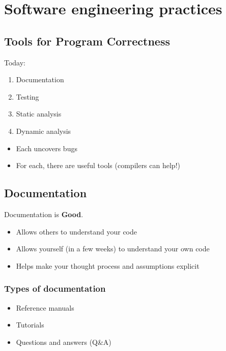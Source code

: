 \documentclass[12pt]{article}
\begin{document}
\newpage
\section{Software engineering practices}
\subsection{Tools for Program Correctness}
Today:
\begin{enumerate}
  \item Documentation
  \item Testing
  \item Static analysis
  \item Dynamic analysis
\end{enumerate}

\begin{itemize}
  \item Each uncovers bugs
  \item For each, there are useful tools (compilers can help!)
\end{itemize}
\subsection{Documentation}

Documentation is \textbf{Good}.

\begin{itemize}
    \item Allows others to understand your code
    \item Allows yourself (in a few weeks) to understand your own code
    \item Helps make your thought process and assumptions explicit
\end{itemize}

\subsubsection{Types of documentation}

\begin{itemize}
    \item Reference manuals
    \item Tutorials
    \item Questions and answers (Q\&A)
\end{itemize}
\end{document}
